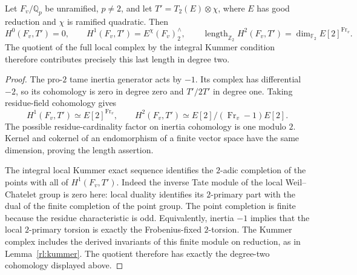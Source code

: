 \begin{lemma}\label{rd:active-local}
Let \(F_v/\mathbb Q_p\) be unramified, \(p\ne2\), and let
\(T'=T_2(E)\otimes\chi\), where \(E\) has good reduction
and \(\chi\) is ramified quadratic.  Then
\begin{equation}
 H^0(F_v,T')=0,\qquad
 H^1(F_v,T')=E^\chi(F_v)^{\wedge}_2,\qquad
 \operatorname{length}_{\mathbb Z_2}H^2(F_v,T')
 =\dim_{\mathbb F_2}E[2]^{\operatorname{Fr}_v}.
 \label{rd:local-length}
\end{equation}
The quotient of the full local complex by the integral Kummer
condition therefore contributes precisely this last length
in degree two.
\end{lemma}

\begin{proof}
The pro-\(2\) tame inertia generator acts by \(-1\).
Its complex has differential \(-2\), so its cohomology is
zero in degree zero and \(T'/2T'\) in degree one.
Taking residue-field cohomology gives
\[
 H^1(F_v,T')\simeq E[2]^{\operatorname{Fr}_v},\qquad
 H^2(F_v,T')\simeq E[2]/(\operatorname{Fr}_v-1)E[2].
 \]
The possible residue-cardinality factor on inertia cohomology
is one modulo \(2\).  Kernel and cokernel of an endomorphism
of a finite vector space have the same dimension, proving
the length assertion.

The integral local Kummer exact sequence identifies the
\(2\)-adic completion of the points with all of \(H^1(F_v,T')\).
Indeed the inverse Tate module of the local Weil--Chatelet
group is zero here: local duality identifies its
\(2\)-primary part with the dual of the finite completion
of the point group.  The point completion is finite because
the residue characteristic is odd.  Equivalently, inertia
\(-1\) implies that the local \(2\)-primary torsion is
exactly the Frobenius-fixed \(2\)-torsion.  The Kummer
complex includes the derived invariants of this finite
module on reduction, as in Lemma~\ref{rl:kummer}.
The quotient therefore has exactly the degree-two
cohomology displayed above.
\end{proof}

